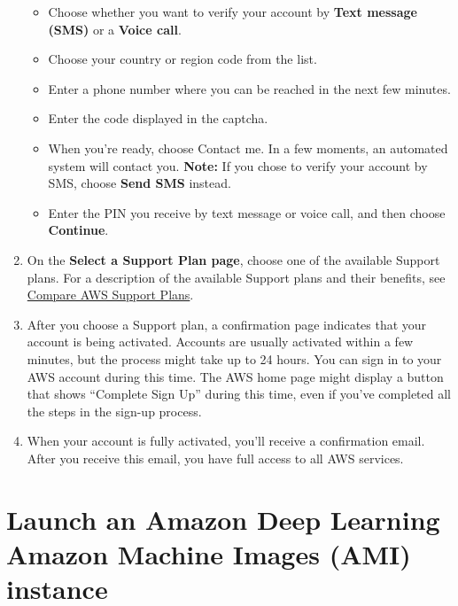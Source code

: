 \documentclass[]{book}
\providecommand{\tightlist}{%
  \setlength{\itemsep}{0pt}\setlength{\parskip}{0pt}}
\begin{document}
\begin{enumerate}
  \begin{itemize}
  \tightlist
  \item
    Choose whether you want to verify your account by \textbf{Text message (SMS)} or a \textbf{Voice call}.
  \item
    Choose your country or region code from the list.
  \item
    Enter a phone number where you can be reached in the next few minutes.
  \item
    Enter the code displayed in the captcha.
  \item
    When you're ready, choose Contact me. In a few moments, an automated system will contact you.
    \textbf{Note:} If you chose to verify your account by SMS, choose \textbf{Send SMS} instead.
  \item
    Enter the PIN you receive by text message or voice call, and then choose \textbf{Continue}.
  \end{itemize}
\item
  On the \textbf{Select a Support Plan page}, choose one of the available Support plans. For a description of the available Support plans and their benefits, see \href{https://aws.amazon.com/premiumsupport/plans/}{Compare AWS Support Plans}.
\item
  After you choose a Support plan, a confirmation page indicates that your account is being activated. Accounts are usually activated within a few minutes, but the process might take up to 24 hours. You can sign in to your AWS account during this time. The AWS home page might display a button that shows ``Complete Sign Up'' during this time, even if you've completed all the steps in the sign-up process.
\item
  When your account is fully activated, you'll receive a confirmation email. After you receive this email, you have full access to all AWS services.
\end{enumerate}

\hypertarget{launch-an-amazon-deep-learning-amazon-machine-images-ami-instance}{%
\chapter{Launch an Amazon Deep Learning Amazon Machine Images (AMI) instance}\label{launch-an-amazon-deep-learning-amazon-machine-images-ami-instance}}
\end{document}
